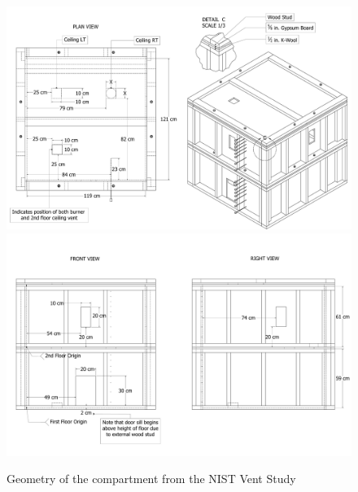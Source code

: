 \begin{figure}[h!]
\includegraphics[width=\textwidth]{FIGURES/NIST_Vent_Study/Latex_Drawing_Plan}
\label{NIST_Vent_Study_3}
\includegraphics[width=\textwidth]{FIGURES/NIST_Vent_Study/Latex_Drawing_Front}
\caption[Geometry of the compartment from the NIST Vent Study]{Geometry of the compartment from the NIST Vent Study}
\label{NIST_Vent_Study_1}
\end{figure}

